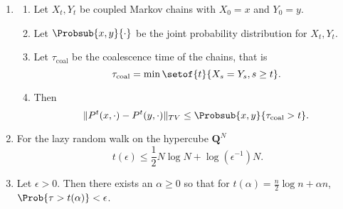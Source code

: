 \documentclass[12pt]{article}
\begin{document}
\begin{enumerate}
\begin{theorem}
        \end{theorem}
      \item
        \begin{theorem}
        \begin{enumerate}
            \item
                Let \( X_t, Y_t \) be coupled Markov chains with \( X_0
                = x \) and \( Y_0 = y \).
            \item
                Let \( \Probsub{x,y}{\cdot} \) be the joint probability
                distribution for \( X_t, Y_t \).
            \item
                Let \( \tau_{\text{coal}} \) be the coalescence time of
                the chains, that is
                \[
                    \tau_{\text{coal}} = \min \setof{t}{X_s = Y_s, s \ge
                    t}.
                \]
            \item
                Then
                \[
                    \| P^t(x, \cdot) - P^t(y,\cdot)\|_{TV} \le \Probsub{x,y}
                    {\tau_{\text{coal}} > t}.
                \]
        \end{enumerate}
    \end{theorem}
\item
    \begin{theorem}
        For the lazy random walk on the hypercube \( \mathbf{Q}^N \)
        \[
            t(\epsilon) \le \frac{1}{2} N \log N + \log(\epsilon^{-1})
            N.
        \]
    \end{theorem}
\item
    \begin{theorem}
        Let \( \epsilon > 0 \).  Then there exists an \( \alpha \ge 0 \)
        so that for \( t(\alpha) = \frac{n}{2} \log n + \alpha n \), \(
        \Prob{\tau > t(\alpha)} < \epsilon \).
    \end{theorem}

\end{enumerate}

\hr

\end{document}
